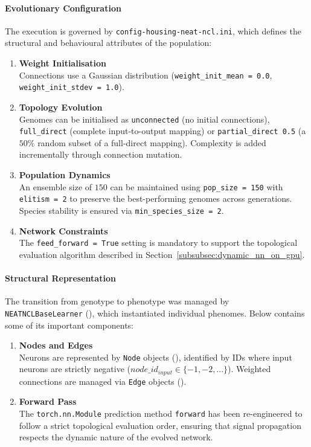 \documentclass{article}
\begin{document}
\paragraph{Evolutionary Configuration}
The execution is governed by \texttt{config-housing-neat-ncl.ini}, which defines the structural and behavioural attributes of the population: 

\begin{enumerate}
    \item \textbf{Weight Initialisation} \\
    Connections use a Gaussian distribution (\lstinline|weight_init_mean = 0.0|, \lstinline|weight_init_stdev = 1.0|). 

    \item \textbf{Topology Evolution} \\
    Genomes can be initialised as \lstinline|unconnected| (no initial connections), \lstinline|full_direct| (complete input-to-output mapping) or \lstinline|partial_direct 0.5| (a $50\%$ random subset of a full-direct mapping). Complexity is added incrementally through connection mutation. 

    \item \textbf{Population Dynamics} \\
    An ensemble size of $150$ can be maintained using \lstinline|pop_size = 150| with \lstinline|elitism = 2| to preserve the best-performing genomes across generations. Species stability is ensured via \lstinline|min_species_size = 2|. 

    \item \textbf{Network Constraints} \\
    The \lstinline|feed_forward = True| setting is mandatory to support the topological evaluation algorithm described in Section~\ref{subsubsec:dynamic_nn_on_gpu}. 
\end{enumerate}

\paragraph{Structural Representation}
The transition from genotype to phenotype was managed by \texttt{NEATNCLBaseLearner} (), which instantiated individual phenomes. Below contains some of its important components: 

\begin{enumerate}
    \item \textbf{Nodes and Edges} \\
    Neurons are represented by \texttt{Node} objects (), identified by IDs where input neurons are strictly negative ($node\_id_{input} \in \{-1, -2, ...\}$). Weighted connections are managed via \texttt{Edge} objects (). 

    \item \textbf{Forward Pass} \\
    The \texttt{torch.nn.Module} prediction method \texttt{forward} has been re-engineered to follow a strict topological evaluation order, ensuring that signal propagation respects the dynamic nature of the evolved network. 
\end{enumerate}
\end{document}
